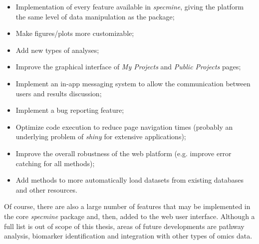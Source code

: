 \begin{itemize}
	\item Implementation of every feature available in \textit{specmine}, giving the platform the same level of data manipulation as the package;
	\item Make figures/plots more customizable;
	\item Add new types of analyses;
	\item Improve the graphical interface of \textit{My Projects} and \textit{Public Projects} pages;
	\item Implement an in-app messaging system to allow the communication between users and results discussion;
	\item Implement a bug reporting feature;
	\item Optimize code execution to reduce page navigation times (probably an  underlying problem of \textit{shiny} for extensive applications);
	\item Improve the overall robustness of the web platform (e.g. improve error catching for all methods);
	\item Add methods to more automatically load datasets from existing databases and other resources.
\end{itemize}

Of course, there are also a large number of features that may be implemented in the core \textit{specmine} package and, then, added to the web user interface.
Although a full list is out of scope of this thesis, areas of future developments are pathway analysis, biomarker identification and integration with other types of omics data.


